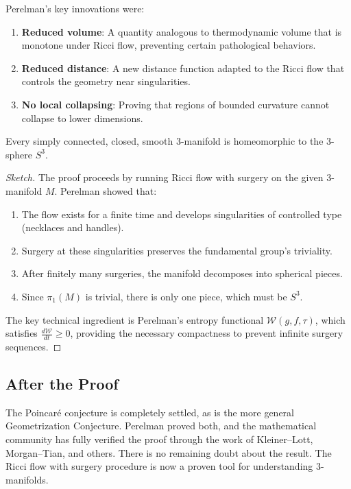 Perelman's key innovations were:

\begin{enumerate}
\item \textbf{Reduced volume}: A quantity analogous to thermodynamic volume that is monotone under Ricci flow, preventing certain pathological behaviors.
\item \textbf{Reduced distance}: A new distance function adapted to the Ricci flow that controls the geometry near singularities.
\item \textbf{No local collapsing}: Proving that regions of bounded curvature cannot collapse to lower dimensions.
\end{enumerate}

\begin{theorem}
Every simply connected, closed, smooth 3-manifold is homeomorphic to the 3-sphere $S^3$.
\end{theorem}

\begin{proof}[Sketch]
The proof proceeds by running Ricci flow with surgery on the given 3-manifold $M$. Perelman showed that:
\begin{enumerate}
\item The flow exists for a finite time and develops singularities of controlled type (necklaces and handles).
\item Surgery at these singularities preserves the fundamental group's triviality.
\item After finitely many surgeries, the manifold decomposes into spherical pieces.
\item Since $\pi_1(M)$ is trivial, there is only one piece, which must be $S^3$.
\end{enumerate}
The key technical ingredient is Perelman's entropy functional $\mathcal{W}(g,f,\tau)$, which satisfies $\frac{d\mathcal{W}}{dt} \geq 0$, providing the necessary compactness to prevent infinite surgery sequences.
\end{proof}

\subsection{After the Proof}

The Poincar\'e conjecture is completely settled, as is the more general Geometrization Conjecture. Perelman proved both, and the mathematical community has fully verified the proof through the work of Kleiner--Lott, Morgan--Tian, and others. There is no remaining doubt about the result. The Ricci flow with surgery procedure is now a proven tool for understanding 3-manifolds.

